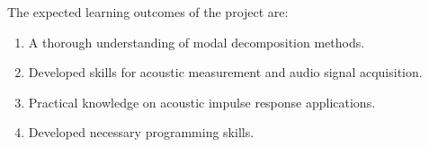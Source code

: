  The expected learning outcomes of the project are:

 \begin{enumerate}
    \item A thorough understanding of modal decomposition methods.
    \item Developed skills for acoustic measurement and audio signal acquisition.
    \item Practical knowledge on acoustic impulse response applications.
    \item Developed necessary programming skills.
 \end{enumerate}
